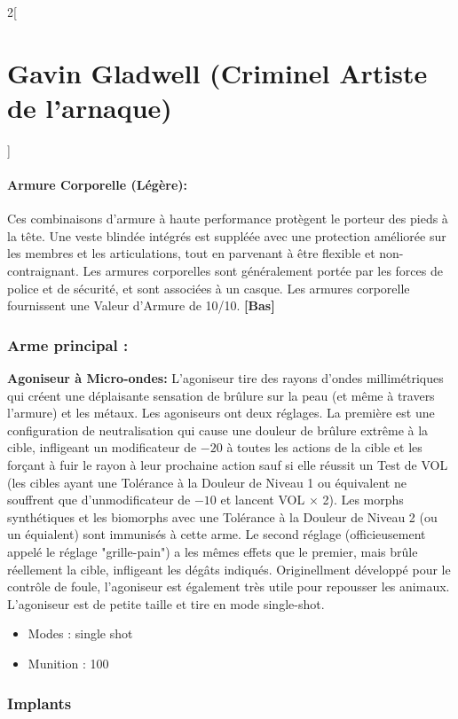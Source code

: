 \documentclass[a4paper,9pt]{article}
\begin{document}
\begin{multicols}{2}[\section*{Gavin Gladwell (Criminel Artiste de l'arnaque)}]
   \paragraph{Armure Corporelle (Légère):} Ces combinaisons d'armure à haute
   performance protègent le porteur des pieds à la tête. Une veste blindée
   intégrés est suppléée avec une protection améliorée sur les membres et les
   articulations, tout en parvenant à être flexible et non-contraignant. Les
   armures corporelles sont généralement portée par les forces de police et de
   sécurité, et sont associées à un casque. Les armures corporelle fournissent
   une Valeur d'Armure de 10/10. \textbf{[Bas]} 

   \subsubsection*{Arme principal :}

   \textbf{Agoniseur à Micro-ondes:} L'agoniseur tire des rayons d'ondes
   millimétriques qui créent une déplaisante sensation de brûlure sur la peau  (et
   même à travers l'armure) et les métaux. Les agoniseurs ont deux réglages. La
   première est une configuration de neutralisation qui cause une douleur de
   brûlure extrême à la cible, infligeant un modificateur de $-20$ à toutes les
   actions de la cible et les forçant à fuir le rayon à leur prochaine action sauf
   si elle réussit un Test de VOL (les cibles ayant une Tolérance à la Douleur de
   Niveau 1 ou équivalent ne souffrent que d'unmodificateur de $-10$ et lancent
   VOL $\times$ 2). Les morphs synthétiques et les biomorphs avec une Tolérance à
   la Douleur de Niveau 2 (ou un équialent) sont immunisés à cette arme. Le second
   réglage (officieusement appelé le réglage "grille-pain") a les mêmes effets que
   le premier, mais brûle réellement la cible, infligeant les dégâts indiqués.
   Originellment développé pour le contrôle de foule, l'agoniseur est également
   très utile pour repousser les animaux. L'agoniseur est de petite taille et tire
   en mode single-shot.

   \begin{itemize}
      \item Modes : single shot
      \item Munition : 100
   \end{itemize}

   \subsubsection*{Implants}


\end{multicols}
\end{document}

